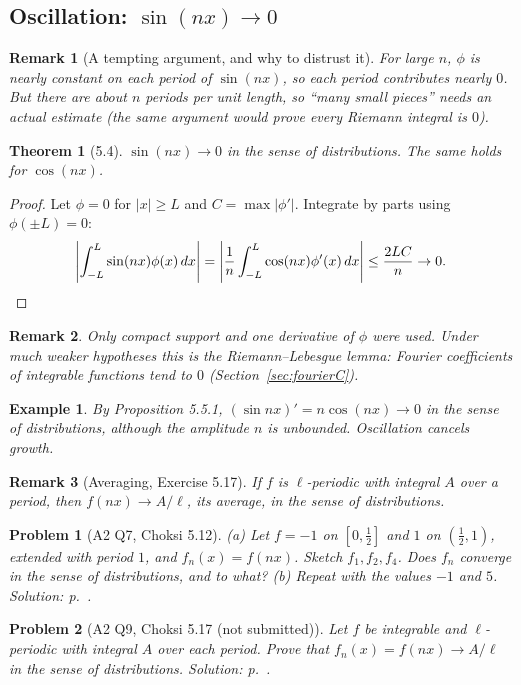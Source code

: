 \documentclass{article}
\newtheorem{theorem}{Theorem}
\newtheorem{problem}{Problem}
\newtheorem*{example}{Example}
\newtheorem{remark}{Remark}
\begin{document}
\subsection{Oscillation: $\sin(nx) \to 0$}
\begin{remark}[A tempting argument, and why to distrust it]
    For large $n$, $\phi$ is nearly constant on each period of $\sin(nx)$, so each period contributes nearly $0$. But there are about $n$ periods per unit length, so ``many small pieces'' needs an actual estimate (the same argument would prove every Riemann integral is $0$).
\end{remark}
\begin{theorem}[5.4]
    $\sin(nx) \to 0$ in the sense of distributions. The same holds for $\cos(nx)$.
\end{theorem}
\begin{proof}
    Let $\phi = 0$ for $|x| \geq L$ and $C = \max|\phi'|$. Integrate by parts using $\phi(\pm L) = 0$:
    \begin{equation}
        \left|\int_{-L}^L \sin(nx)\phi(x)\,dx\right| = \left|\frac{1}{n}\int_{-L}^L \cos(nx)\phi'(x)\,dx\right| \leq \frac{2LC}{n} \to 0. \qedhere
    \end{equation}
\end{proof}
\begin{remark}
    Only compact support and one derivative of $\phi$ were used. Under much weaker hypotheses this is the \emph{Riemann--Lebesgue lemma}: Fourier coefficients of integrable functions tend to $0$ (Section~\ref{sec:fourierC}).
\end{remark}
\begin{example}
    By Proposition 5.5.1, $(\sin nx)' = n\cos(nx) \to 0$ in the sense of distributions, although the amplitude $n$ is unbounded. Oscillation cancels growth.
\end{example}
\begin{remark}[Averaging, Exercise 5.17]
    If $f$ is $\ell$-periodic with integral $A$ over a period, then $f(nx) \to A/\ell$, its average, in the sense of distributions.
\end{remark}

\begin{problem}[A2 Q7, Choksi 5.12]\label{prob:a2-512}
    (a) Let $f = -1$ on $[0,\frac12]$ and $1$ on $(\frac12,1)$, extended with period $1$, and $f_n(x) = f(nx)$. Sketch $f_1, f_2, f_4$. Does $f_n$ converge in the sense of distributions, and to what? (b) Repeat with the values $-1$ and $5$.
    \hfill \emph{Solution: p.~\pageref{sol:a2-512}.}
\end{problem}
\begin{problem}[A2 Q9, Choksi 5.17 (not submitted)]\label{prob:a2-517}
    Let $f$ be integrable and $\ell$-periodic with integral $A$ over each period. Prove that $f_n(x) = f(nx) \to A/\ell$ in the sense of distributions.
    \hfill \emph{Solution: p.~\pageref{sol:a2-517}.}
\end{problem}
\end{document}
